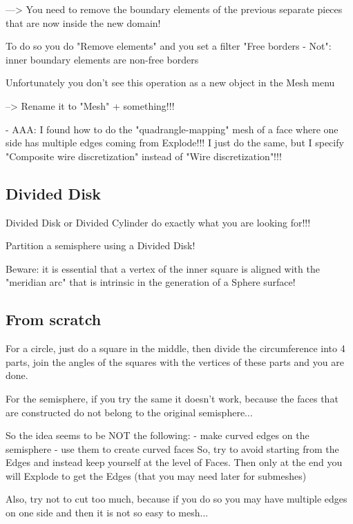 \documentclass[10pt]{book}
\begin{document}
     ---> You need to remove the boundary elements of the previous separate pieces that are now inside the new domain!
     
          To do so you do "Remove elements" and you set a filter "Free borders - Not": inner boundary elements are non-free borders
          
          Unfortunately you don't see this operation as a new object in the Mesh menu
          
     --> Rename it to "Mesh" + something!!!
     
 
- AAA: I found how to do the "quadrangle-mapping" mesh of a face where one side has multiple edges coming from Explode!!! 
  I just do the same, but I specify "Composite wire discretization" instead of "Wire discretization"!!!
    
 

\subsection{Divided Disk}

Divided Disk or Divided Cylinder do exactly what you are looking for!!!

Partition a semisphere using a Divided Disk!

Beware: it is essential that a vertex of the inner square is aligned with the "meridian arc" that is intrinsic in the generation of a Sphere surface!

\subsection{From scratch}

For a circle, just do a square in the middle, then divide the circumference into 4 parts,
join the angles of the squares with the vertices of these parts and you are done.

For the semisphere, if you try the same it doesn't work, because the faces that are constructed
do not belong to the original semisphere...

So the idea seems to be NOT the following:
 - make curved edges on the semisphere
 - use them to create curved faces
  So, try to avoid starting from the Edges and instead keep yourself at the level of Faces.
  Then only at the end you will Explode to get the Edges (that you may need later for submeshes)
  
  Also, try not to cut too much, because if you do so you may have multiple edges on one side and then it is not so easy to mesh...
 
\end{document}
